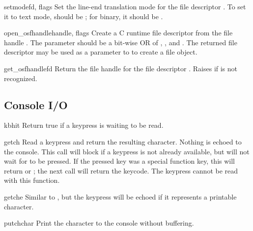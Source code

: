 \begin{funcdesc}{setmode}{fd, flags}
  Set the line-end translation mode for the file descriptor .
  To set it to text mode,  should be ;
  for binary, it should be .
\end{funcdesc}

\begin{funcdesc}{open_osfhandle}{handle, flags}
  Create a C runtime file descriptor from the file handle
  .  The  parameter should be a bit-wise OR of
  , , and
  .  The returned file descriptor may be used as a
  parameter to  to create a file object.
\end{funcdesc}

\begin{funcdesc}{get_osfhandle}{fd}
  Return the file handle for the file descriptor .  Raises
   if  is not recognized.
\end{funcdesc}


\subsection{Console I/O \label{msvcrt-console}}

\begin{funcdesc}{kbhit}{}
  Return true if a keypress is waiting to be read.
\end{funcdesc}

\begin{funcdesc}{getch}{}
  Read a keypress and return the resulting character.  Nothing is
  echoed to the console.  This call will block if a keypress is not
  already available, but will not wait for  to be pressed.
  If the pressed key was a special function key, this will return
   or ; the next call will return the
  keycode.  The  keypress cannot be read with this
  function.
\end{funcdesc}

\begin{funcdesc}{getche}{}
  Similar to , but the keypress will be echoed if it 
  represents a printable character.
\end{funcdesc}

\begin{funcdesc}{putch}{char}
  Print the character  to the console without buffering.
\end{funcdesc}

